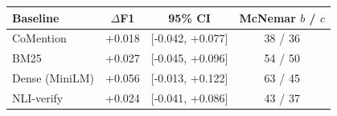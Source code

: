 \setlength{\tabcolsep}{3pt}
\begin{tabular}{lccc}
\toprule
Baseline & $\Delta$F1 & 95\% CI & McNemar $b$ / $c$ \\
\midrule
CoMention & +0.018 & [-0.042, +0.077] & 38 / 36 \\
BM25 & +0.027 & [-0.045, +0.096] & 54 / 50 \\
Dense (MiniLM) & +0.056 & [-0.013, +0.122] & 63 / 45 \\
NLI-verify & +0.024 & [-0.041, +0.086] & 43 / 37 \\
\bottomrule
\end{tabular}
